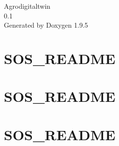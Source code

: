 \documentclass[twoside]{book}
\newcommand{\+}{\discretionary{\mbox{\scriptsize$\hookleftarrow$}}{}{}}
\newcommand{\clearemptydoublepage}{%
    \newpage{\pagestyle{empty}\cleardoublepage}%
  }
\begin{document}
  \raggedbottom
    \hypersetup{pageanchor=false,
                bookmarksnumbered=true,
                pdfencoding=unicode
               }
  \begin{titlepage}
  \vspace*{7cm}
  \begin{center}%
  {\Large Agrodigitaltwin}\\
  [1ex]\large 0.\+1 \\
  \vspace*{1cm}
  {\large Generated by Doxygen 1.9.5}\\
  \end{center}
  \end{titlepage}
  \clearemptydoublepage
  \tableofcontents
  \clearemptydoublepage
  \hypersetup{pageanchor=true}
\chapter{SOS\+\_\+\+README}
\label{md__d___source_shev4enkoyar__digital_twin__gateway_bin__release_netcoreapp3_1__gateway_publish__s_o_s__r_e_a_d_m_e}

\chapter{SOS\+\_\+\+README}
\label{md__d___source_shev4enkoyar__digital_twin__gateway_bin__release_netcoreapp3_1_linux_x64__s_o_s__r_e_a_d_m_e}

\chapter{SOS\+\_\+\+README}
\label{md__d___source_shev4enkoyar__digital_twin__gateway_obj__release_netcoreapp3_1_linux_x64__pub_tmp__out__s_o_s__r_e_a_d_m_e}

\end{document}
